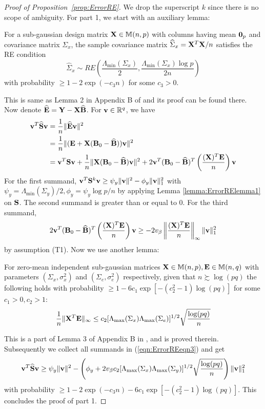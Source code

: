 \documentclass[12pt, letterpaper]{article}
\theoremstyle{definition}
\numberwithin{equation}{section}
\begin{document}
\begin{proof}[Proof of Proposition~\ref{prop:ErrorRE}]
We drop the superscript $k$ since there is no scope of ambiguity. For part 1, we start with an auxiliary lemma:
%
\begin{Lemma}\label{lemma:ErrorRElemma1}
For a sub-gaussian design matrix ${\mathbf{X}} \in {\mathbb{M}}(n,p)$ with columns having mean ${\bf 0}_p$ and covariance matrix $\Sigma_x$, the sample covariance matrix $\widehat \Sigma_x = {\mathbf{X}}^T {\mathbf{X}}/n$ satisfies the RE condition
%
$$
\widehat \Sigma_x \sim RE \left( \frac{\Lambda_{\min} ( \Sigma_x) }{2}, \frac{\Lambda_{\min} ( \Sigma_x) \log p }{2 n} \right)
$$
%
with probability $\geq 1 - 2 \exp(-c_3 n)$ for some $c_3 > 0$.
\end{Lemma}
%
This is same as Lemma 2 in Appendix B of \cite{LinEtal16} and its proof can be found there. Now denote $\widehat {{\mathbf{E}}} = {\mathbf{Y}} - {\mathbf{X}} \widehat {{\mathbf{B}}}$. For ${\bf{v}} \in {\mathbb{R}}^q$, we have
%
\begin{align}\label{eqn:ErrorREeqn3}
{\bf{v}}^T \widehat {{\mathbf{S}}} {\bf{v}} &= \frac{1}{n} \| \widehat {{\mathbf{E}}} {\bf{v}} \|^2 \notag\\
&= \frac{1}{n} \| ({\mathbf{E}} + {\mathbf{X}} ( {\mathbf{B}}_0 - \widehat {{\mathbf{B}}} )){\bf{v}} \|^2 \notag\\
&= {\bf{v}}^T {\mathbf{S}} {\bf{v}} + \frac{1}{n} \| {\mathbf{X}} ({\mathbf{B}}_0 - \widehat {{\mathbf{B}}}) {\bf{v}} \|^2 + 2 {\bf{v}}^T ({\mathbf{B}}_0 - \widehat {{\mathbf{B}}})^T \left( \frac {({\mathbf{X}})^T {\mathbf{E}}}{n} \right) {\bf{v}}
\end{align}
%
For the first summand, $ {\bf{v}}^T {\mathbf{S}}^k {\bf{v}} \geq \psi_y \| {\bf{v}} \|^2 - \phi_y \| {\bf{v}} \|_1^2$ with $\psi_y = \Lambda_{\min} (\Sigma_y)/2, \phi_y = \psi_y \log p/n$ by applying Lemma \ref{lemma:ErrorRElemma1} on ${\mathbf{S}}$. The second summand is greater than or equal to 0. For the third summand,
%
$$
2 {\bf{v}}^T ({\mathbf{B}}_0 - \widehat {{\mathbf{B}}})^T \left( \frac {({\mathbf{X}})^T {\mathbf{E}}}{n} \right) {\bf{v}} \geq
-2 v_\beta \left\| \frac {({\mathbf{X}})^T {\mathbf{E}}}{n} \right\|_\infty \| {\bf{v}} \|_1^2
$$
%
by assumption (T1). Now we use another lemma:
%
\begin{Lemma}\label{lemma:ErrorRElemma2}
For zero-mean independent sub-gaussian matrices ${\mathbf{X}} \in {\mathbb{M}}(n,p), {\mathbf{E}} \in {\mathbb{M}}(n,q)$ with parameters $(\Sigma_x, \sigma_x^2)$ and $(\Sigma_e, \sigma_e^2)$ respectively, given that $n \succsim \log(pq)$ the following holds with probability $\geq 1 - 6c_1 \exp [-(c_2^2-1) \log(pq)]$ for some $c_1 >0, c_2 > 1$:
%
$$
\frac{1}{n} \| {\mathbf{X}}^T {\mathbf{E}} \|_\infty \leq c_2 [ \Lambda_{\max} (\Sigma_x) \Lambda_{\max} (\Sigma_e) ]^{1/2} \sqrt{\frac{ \log(pq)}{n}}
$$
%
\end{Lemma}
%
This is a part of Lemma 3 of Appendix B in \cite{LinEtal16}, and is proved therein. Subsequently we collect all summands in (\ref{eqn:ErrorREeqn3}) and get
%
$$
{\bf{v}}^T \widehat{ {\mathbf{S}}} {\bf{v}} \geq \psi_y \| {\bf{v}} \|^2 - \left( \phi_y + 2 v_\beta c_2 [ \Lambda_{\max} (\Sigma_x) \Lambda_{\max} (\Sigma_y) ]^{1/2} \sqrt{\frac{ \log(pq)}{n}} \right) \| {\bf{v}} \|_1^2
$$
with probability $\geq 1 - 2\exp(- c_3 n) - 6c_1 \exp [-(c_2^2-1) \log(pq)]$. This concludes the proof of part 1.


\end{proof}
\end{document}
